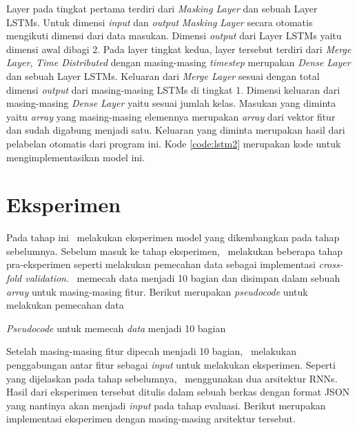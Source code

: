 Layer pada tingkat pertama terdiri dari \textit{Masking Layer} dan sebuah Layer LSTMs. Untuk dimensi \textit{input} dan \textit{output} \textit{Masking Layer} secara otomatis mengikuti dimensi dari data masukan. Dimensi \textit{output} dari Layer LSTMs yaitu dimensi awal dibagi 2. Pada layer tingkat kedua, layer tersebut terdiri dari \textit{Merge Layer}, \textit{Time Distributed} dengan masing-masing \textit{timestep} merupakan \textit{Dense Layer} dan sebuah Layer LSTMs. Keluaran dari \textit{Merge Layer} sesuai dengan total dimensi \textit{output} dari masing-masing LSTMs di tingkat 1. Dimensi keluaran dari masing-masing \textit{Dense Layer} yaitu sesuai jumlah kelas.
Masukan yang diminta yaitu \textit{array} yang masing-masing elemennya merupakan \textit{array} dari vektor fitur dan sudah digabung menjadi satu. Keluaran yang diminta merupakan hasil dari pelabelan otomatis dari program ini. Kode \ref{code:lstm2} merupakan kode untuk mengimplementasikan model ini.

\section{Eksperimen}
Pada tahap ini \saya~melakukan eksperimen model yang dikembangkan pada tahap sebelumnya. Sebelum masuk ke tahap eksperimen, \saya~melakukan beberapa tahap pra-eksperimen seperti melakukan pemecahan data sebagai implementasi \textit{cross-fold validation}. \Saya~memecah data menjadi 10 bagian dan disimpan dalam sebuah \textit{array} untuk masing-masing fitur. Berikut merupakan \textit{pseudocode} untuk melakukan pemecahan data

\begin{kode}

	
	
	\caption{\textit{Pseudocode} untuk memecah \textit{data} menjadi 10 bagian}	
	\label{code:split}
\end{kode}

Setelah masing-masing fitur dipecah menjadi 10 bagian, \saya~melakukan penggabungan antar fitur sebagai \textit{input} untuk melakukan eksperimen. Seperti yang dijelaskan pada tahap sebelumnya, \saya~menggunakan dua arsitektur RNNs. Hasil dari eksperimen tersebut ditulis dalam sebuah berkas dengan format JSON yang nantinya akan menjadi \textit{input} pada tahap evaluasi. Berikut merupakan implementasi eksperimen dengan masing-masing arsitektur tersebut.

